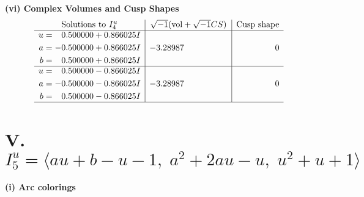\documentclass[1p]{elsarticle_modified}
\theoremstyle{definition}
\newcommand{\I}{\sqrt{-1}}
\begin{document}
\newpage\flushleft \textbf{(vi) Complex Volumes and Cusp Shapes}
$$\begin{array}{c|c|c}  
\text{Solutions to }I^u_{4}& \I (\text{vol} + \sqrt{-1}CS) & \text{Cusp shape}\\
 \hline 
\begin{aligned}
u &= \phantom{-}0.500000 + 0.866025 I \\
a &= -0.500000 + 0.866025 I \\
b &= \phantom{-}0.500000 + 0.866025 I\end{aligned}
 & -3.28987\phantom{ +0.000000I} & \phantom{-0.000000 } 0 \\ \hline\begin{aligned}
u &= \phantom{-}0.500000 - 0.866025 I \\
a &= -0.500000 - 0.866025 I \\
b &= \phantom{-}0.500000 - 0.866025 I\end{aligned}
 & -3.28987\phantom{ +0.000000I} & \phantom{-0.000000 } 0\\
 \hline 
 \end{array}$$\newpage\newpage\renewcommand{\arraystretch}{1}
\centering \section*{V. $I^u_{5}= \langle a u+b- u-1,\;a^2+2 a u- u,\;u^2+u+1 \rangle$}
\flushleft \textbf{(i) Arc colorings}\\
\end{document}
